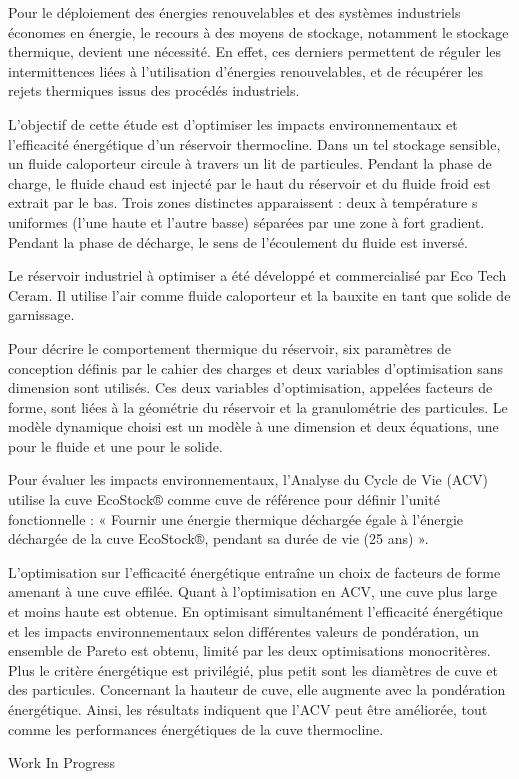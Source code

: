 {\normalsize
Pour le déploiement des énergies renouvelables et des systèmes industriels économes en énergie, le recours à des moyens de stockage, notamment le stockage thermique, devient une nécessité. En effet, ces derniers permettent de réguler les intermittences liées à l'utilisation d'énergies renouvelables, et de récupérer les rejets thermiques issus des procédés industriels.



L'objectif de cette étude est d'optimiser les impacts environnementaux et l'efficacité énergétique d'un réservoir thermocline. Dans un tel stockage sensible, un fluide caloporteur circule à travers un lit de particules. Pendant la phase de charge, le fluide chaud est injecté par le haut du réservoir et du fluide froid est extrait par le bas. Trois zones distinctes apparaissent : deux à température s uniformes (l'une haute et l'autre basse) séparées par une zone à fort gradient. Pendant la phase de décharge, le sens de l'écoulement du fluide est inversé.



Le réservoir industriel à optimiser a été développé et commercialisé par Eco Tech Ceram. Il utilise l'air comme fluide caloporteur et la bauxite en tant que solide de garnissage.







Pour décrire le comportement thermique du réservoir, six paramètres de conception définis par le cahier des charges et deux variables d'optimisation sans dimension sont utilisés. Ces deux variables d'optimisation, appelées facteurs de forme, sont liées à la géométrie du réservoir et la granulométrie des particules. Le modèle dynamique choisi est un modèle à une dimension et deux équations, une pour le fluide et une pour le solide. 



Pour évaluer les impacts environnementaux, l'Analyse du Cycle de Vie (ACV) utilise la cuve EcoStock® comme cuve de référence pour définir l'unité fonctionnelle : « Fournir une énergie thermique déchargée égale à l'énergie déchargée de la cuve EcoStock®, pendant sa durée de vie (25 ans) ». 







L'optimisation sur l'efficacité énergétique entraîne un choix de facteurs de forme amenant à une cuve effilée. Quant à l'optimisation en ACV, une cuve plus large et moins haute est obtenue. En optimisant simultanément l'efficacité énergétique et les impacts environnementaux selon différentes valeurs de pondération, un ensemble de Pareto est obtenu, limité par les deux optimisations monocritères. Plus le critère énergétique est privilégié, plus petit sont les diamètres de cuve et des particules. Concernant la hauteur de cuve, elle augmente avec la pondération énergétique. Ainsi, les résultats indiquent que l'ACV peut être améliorée, tout comme les performances énergétiques de la cuve thermocline.

 \vfill Work In Progress

}
 
